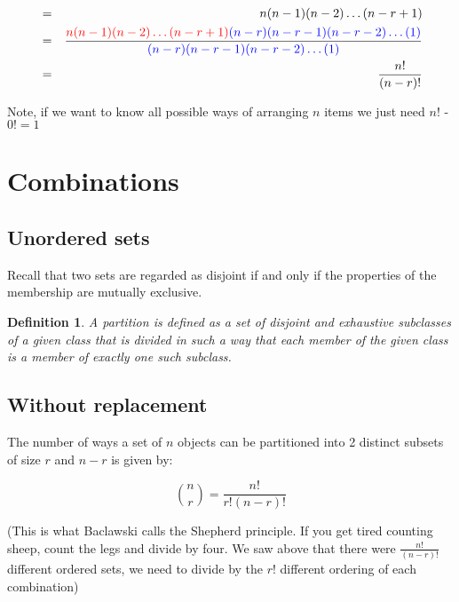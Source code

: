 \documentclass[12pt]{extbook}
\newtheorem{df}{Definition}[section]
\begin{document}
\begin{eqnarray*}
&=& n(n-1)(n-2)\ldots(n-r+1) \\
&=& \frac{ {\color{red} n(n-1)(n-2)\ldots(n-r+1)} {\color{blue} (n-r)(n-r-1)(n-r-2)\ldots(1)}}{{\color{blue} (n-r)(n-r-1)(n-r-2)\ldots(1)}} \\
&=& \frac{n!}{(n-r)!}
\end{eqnarray*}


Note, if we want to know all possible ways of arranging $n$ items we just need $n!$ - $0! = 1$

 

 

\section{Combinations}

\subsection{Unordered sets}

Recall that two sets are regarded as disjoint if and only if the properties of the membership are mutually exclusive.  

\begin{df}
A \emph{partition} is defined as a set of disjoint and exhaustive subclasses of a given class that is divided in such a way that each member of the given class is a member of exactly one such subclass.
\end{df}
 

\subsection{Without replacement}

The number of ways a set of $n$ objects can be partitioned into 2 distinct subsets of size $r$ and $n-r$ is given by:

\begin{equation}
{n \choose r} = \frac{n!}{r!(n-r)!}
\end{equation}

(This is what Baclawski calls the Shepherd principle.   If you get tired counting sheep, count the legs and divide by four.   We saw above that there were $\frac{n!}{(n-r)!}$ different ordered sets, we need to divide by the $r!$ different ordering of each combination)
\end{document}
